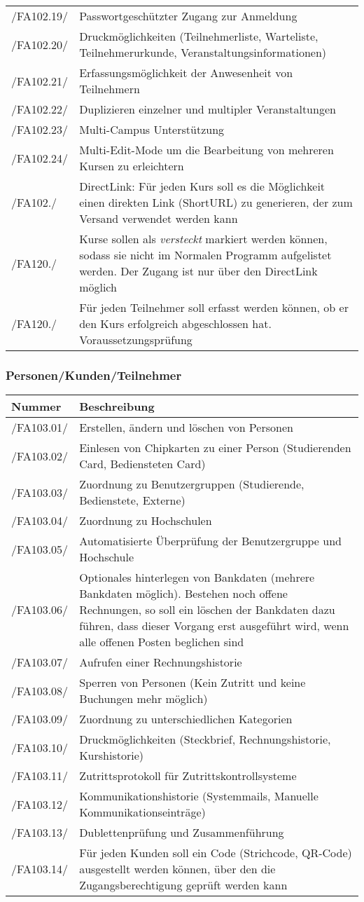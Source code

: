 \documentclass[a4paper,11pt]{article}
\newcommand\addrow[2]{#1 &#2\\ }
\newcommand\addheading[2]{#1 &#2\\ \hline}
\newcommand\tabularhead{\begin{tabular}{lp{13cm}}
\hline
}
\newenvironment{usecase}{\tabularhead}
{\hline\end{tabular}}
\begin{document}
\begin{usecase}
  \addrow{/FA102.19/}{Passwortgeschützter Zugang zur Anmeldung}
  \addrow{/FA102.20/}{Druckmöglichkeiten (Teilnehmerliste, Warteliste, Teilnehmerurkunde, Veranstaltungsinformationen)}
  \addrow{/FA102.21/}{Erfassungsmöglichkeit der Anwesenheit von Teilnehmern}
  \addrow{/FA102.22/}{Duplizieren einzelner und multipler Veranstaltungen}
  \addrow{/FA102.23/}{Multi-Campus Unterstützung}
  \addrow{/FA102.24/}{Multi-Edit-Mode um die Bearbeitung von mehreren Kursen zu erleichtern}
  \addrow{/FA102./}{DirectLink: Für jeden Kurs soll es die Möglichkeit einen direkten Link (ShortURL) zu generieren, der zum Versand verwendet werden kann}
  \addrow{/FA120./}{Kurse sollen als \textit{versteckt} markiert werden können, sodass sie nicht im Normalen Programm aufgelistet werden. Der Zugang ist nur über den DirectLink möglich}
  \addrow{/FA120./}{Für jeden Teilnehmer soll erfasst werden können, ob er den Kurs erfolgreich abgeschlossen hat. Voraussetzungsprüfung}
\end{usecase}

\subsubsection{Personen/Kunden/Teilnehmer}
\begin{usecase}
  \addheading{Nummer}{Beschreibung} 
  \addrow{/FA103.01/}{Erstellen, ändern und löschen von Personen}
  \addrow{/FA103.02/}{Einlesen von Chipkarten zu einer Person (Studierenden Card, Bediensteten Card)}
  \addrow{/FA103.03/}{Zuordnung zu Benutzergruppen (Studierende, Bedienstete, Externe)}
  \addrow{/FA103.04/}{Zuordnung zu Hochschulen}
  \addrow{/FA103.05/}{Automatisierte Überprüfung der Benutzergruppe und Hochschule}
  \addrow{/FA103.06/}{Optionales hinterlegen von Bankdaten (mehrere Bankdaten möglich). Bestehen noch offene Rechnungen, so soll ein löschen der Bankdaten dazu führen, dass dieser Vorgang erst ausgeführt wird, wenn alle offenen Posten beglichen sind}
  \addrow{/FA103.07/}{Aufrufen einer Rechnungshistorie}
  \addrow{/FA103.08/}{Sperren von Personen (Kein Zutritt und keine Buchungen mehr möglich)}
  \addrow{/FA103.09/}{Zuordnung zu unterschiedlichen Kategorien}
  \addrow{/FA103.10/}{Druckmöglichkeiten (Steckbrief, Rechnungshistorie, Kurshistorie)}
  \addrow{/FA103.11/}{Zutrittsprotokoll für Zutrittskontrollsysteme}
  \addrow{/FA103.12/}{Kommunikationshistorie (Systemmails, Manuelle Kommunikationseinträge)}
  \addrow{/FA103.13/}{Dublettenprüfung und Zusammenführung}
  \addrow{/FA103.14/}{Für jeden Kunden soll ein Code (Strichcode, QR-Code) ausgestellt werden können, über den die Zugangsberechtigung geprüft werden kann}
\end{usecase}
\end{document}
